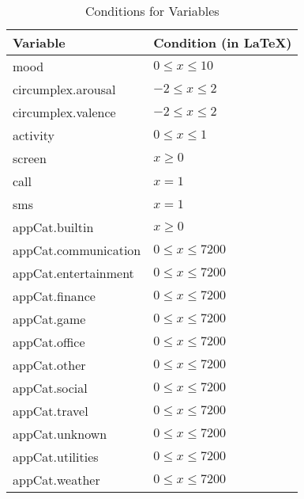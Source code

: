 \begin{table}[htbp]
\centering
\begin{tabular}{|l|l|}
\hline
\textbf{Variable}        & \textbf{Condition (in LaTeX)}      \\ \hline
mood                     & \(0 \leq x \leq 10\)              \\ \hline
circumplex.arousal       & \(-2 \leq x \leq 2\)              \\ \hline
circumplex.valence       & \(-2 \leq x \leq 2\)              \\ \hline
activity                 & \(0 \leq x \leq 1\)               \\ \hline
screen                   & \(x \geq 0\)                      \\ \hline
call                     & \(x = 1\)                         \\ \hline
sms                      & \(x = 1\)                         \\ \hline
appCat.builtin           & \(x \geq 0\)                      \\ \hline
appCat.communication     & \(0 \leq x \leq 7200\)            \\ \hline
appCat.entertainment     & \(0 \leq x \leq 7200\)            \\ \hline
appCat.finance           & \(0 \leq x \leq 7200\)            \\ \hline
appCat.game              & \(0 \leq x \leq 7200\)            \\ \hline
appCat.office            & \(0 \leq x \leq 7200\)            \\ \hline
appCat.other             & \(0 \leq x \leq 7200\)            \\ \hline
appCat.social            & \(0 \leq x \leq 7200\)            \\ \hline
appCat.travel            & \(0 \leq x \leq 7200\)            \\ \hline
appCat.unknown           & \(0 \leq x \leq 7200\)            \\ \hline
appCat.utilities         & \(0 \leq x \leq 7200\)            \\ \hline
appCat.weather           & \(0 \leq x \leq 7200\)            \\ \hline
\end{tabular}
\caption{Conditions for Variables}
\label{tab:conditions}
\end{table}
